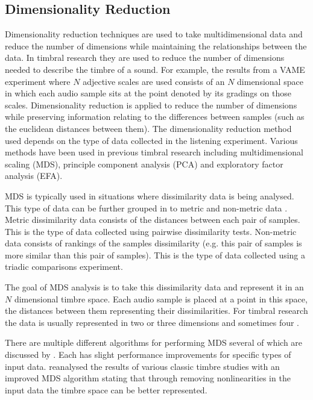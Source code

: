 	\subsection{Dimensionality Reduction}
	\label{sec:Timbre-DimensionalityReduction}
		Dimensionality reduction techniques are used to take multidimensional data and reduce the number of
		dimensions while maintaining the relationships between the data. In timbral research they are used to reduce
		the number of dimensions needed to describe the timbre of a sound. For example, the results from a VAME
		experiment where $N$ adjective scales are used consists of an $N$ dimensional space in which each audio
		sample sits at the point denoted by its gradings on those scales. Dimensionality reduction is applied to
		reduce the number of dimensions while preserving information relating to the differences between samples
		(such as the euclidean distances between them). The dimensionality reduction method used depends on the type
		of data collected in the listening experiment.  Various methods have been used in previous timbral research
		including multidimensional scaling (MDS), principle component analysis (PCA) and exploratory factor analysis
		(EFA).

		MDS is typically used in situations where dissimilarity data is being analysed. This type of data can be
		further grouped in to metric and non-metric data \citep{hair2013multivariate}. Metric dissimilarity data
		consists of the distances between each pair of samples. This is the type of data collected using pairwise
		dissimilarity tests. Non-metric data consists of rankings of the samples dissimilarity (e.g. this pair of
		samples is more similar than this pair of samples). This is the type of data collected using a triadic
		comparisons experiment.

		The goal of MDS analysis is to take this dissimilarity data and represent it in an $N$ dimensional timbre
		space.  Each audio sample is placed at a point in this space, the distances between them representing their
		dissimilarities. For timbral research the data is usually represented in two \citep{giragama2003relating}
		or three \citep{grey1978perceptual} dimensions and sometimes four \citep{bernays2011verbal}.
		
		There are multiple different algorithms for performing MDS several of which are discussed by
		\citet{mcadams1999perspectives}. Each has slight performance improvements for specific types of input data.
		\citet{burgoyne2008a} reanalysed the results of various classic timbre studies with an improved MDS
		algorithm stating that through removing nonlinearities in the input data the timbre space can be better
		represented.

